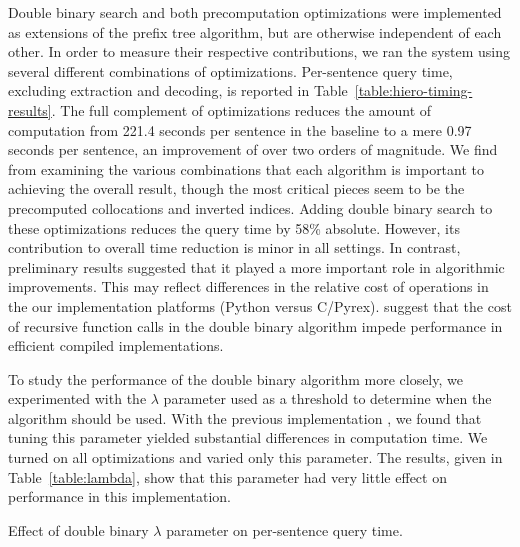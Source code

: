 Double binary search and both precomputation optimizations 
were implemented as extensions of the prefix tree algorithm, 
but are otherwise independent
of each other.  In order to measure their respective
contributions, we ran the system using several different 
combinations of optimizations.  Per-sentence query time, 
excluding extraction and decoding, is reported
in Table~\ref{table:hiero-timing-results}.  The full
complement of optimizations reduces the amount of computation
from 221.4 seconds per sentence in the baseline to a mere
0.97 seconds per sentence, an improvement of over two
orders of magnitude.  We find from examining the various
combinations that each algorithm is important to achieving
the overall result, though the most critical pieces 
seem to be the precomputed collocations and inverted
indices.  Adding double binary search to these
optimizations reduces the query
time by 58\% absolute.  However, its contribution to 
overall time reduction is minor in all settings.
In contrast, preliminary results
\citep{Lopez:2007:emnlp-conll} suggested that
it played a more important role in algorithmic
improvements.  This may reflect differences in the
relative cost of operations in the our implementation
platforms (Python versus C/Pyrex). \citet{Sanders:2007:alenex} 
suggest that the cost of recursive function calls in 
the double binary algorithm impede performance 
in efficient compiled implementations.

To study the performance of the double binary algorithm
more closely, we experimented with the $\lambda$ parameter
used as a threshold to determine when the algorithm should
be used.  With the previous implementation \citep{Lopez:2007:emnlp-conll},
we found that tuning this parameter yielded substantial
differences in computation time.
We turned on all optimizations and varied only this
parameter.  The results, given in Table~\ref{table:lambda},
show that this parameter had very little effect on performance
in this implementation.

\begin{table}
	\begin{center}
	
	\caption{Effect of double binary $\lambda$ parameter on per-sentence query time.}
	\label{table:lambda}
	\end{center}
\end{table}

